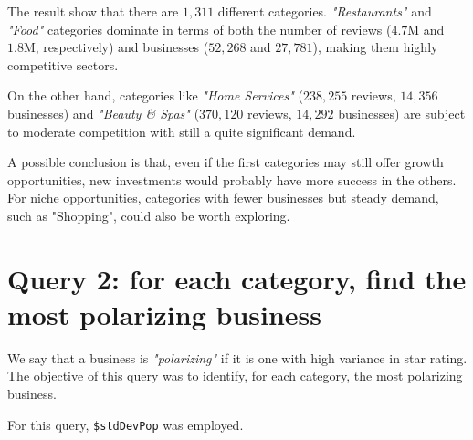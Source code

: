 \documentclass{Configuration_Files/PoliMi3i_thesis}
\begin{document}
\bigskip

The result show that there are $1,311$ different categories. \textit{"Restaurants"} and \textit{"Food"} categories dominate in terms of both the number of reviews ($4.7\text{M}$ and $1.8\text{M}$, respectively) and businesses ($52,268$ and $27,781$), making them highly competitive sectors. 

On the other hand, categories like \textit{"Home Services"} ($238,255$ reviews, $14,356$ businesses) and \textit{"Beauty \& Spas"} ($370,120$ reviews, $14,292$ businesses) are subject to moderate competition with still a quite significant demand.

A possible conclusion is that, even if the first categories may still offer growth opportunities, new investments would probably have more success in the others. For niche opportunities, categories with fewer businesses but steady demand, such as "Shopping", could also be worth exploring. 

\section{Query 2: for each category, find the most polarizing business}
We say that a business is \textit{"polarizing"} if it is one with high variance in star rating. The objective of this query was to identify, for each category, the most polarizing business.

For this query, \texttt{\$stdDevPop} was employed.

\bigskip
\end{document}
